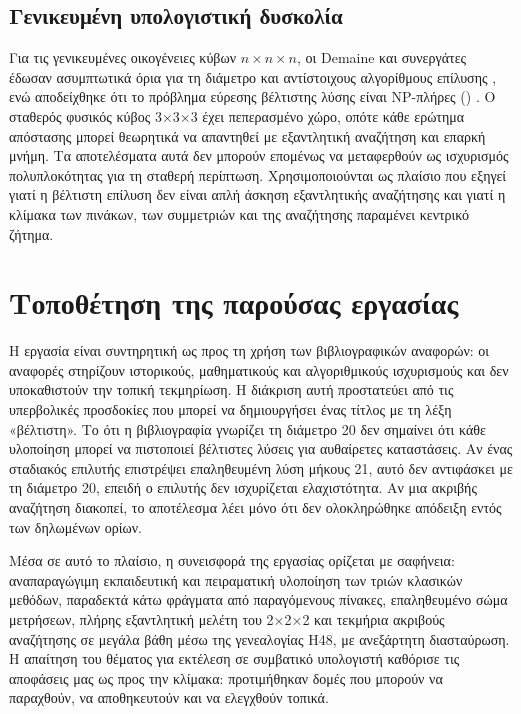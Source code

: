\subsection{Γενικευμένη υπολογιστική δυσκολία}
\label{sec:background-complexity}

Για τις γενικευμένες οικογένειες κύβων \(n\times n\times n\), οι Demaine και συνεργάτες έδωσαν ασυμπτωτικά όρια για τη διάμετρο και αντίστοιχους αλγορίθμους επίλυσης \cite{demaine2011rubik}, ενώ αποδείχθηκε ότι το πρόβλημα εύρεσης βέλτιστης λύσης είναι NP-πλήρες () \cite{demaine2018npcomplete}. Ο σταθερός φυσικός κύβος 3×3×3 έχει πεπερασμένο χώρο, οπότε κάθε ερώτημα απόστασης μπορεί θεωρητικά να απαντηθεί με εξαντλητική αναζήτηση και επαρκή μνήμη. Τα αποτελέσματα αυτά δεν μπορούν επομένως να μεταφερθούν ως ισχυρισμός πολυπλοκότητας για τη σταθερή περίπτωση. Χρησιμοποιούνται ως πλαίσιο που εξηγεί γιατί η βέλτιστη επίλυση δεν είναι απλή άσκηση εξαντλητικής αναζήτησης και γιατί η κλίμακα των πινάκων, των συμμετριών και της αναζήτησης παραμένει κεντρικό ζήτημα.

\section{Τοποθέτηση της παρούσας εργασίας}
\label{sec:background-positioning}

Η εργασία είναι συντηρητική ως προς τη χρήση των βιβλιογραφικών αναφορών: οι αναφορές στηρίζουν ιστορικούς, μαθηματικούς και αλγοριθμικούς ισχυρισμούς και δεν υποκαθιστούν την τοπική τεκμηρίωση. Η διάκριση αυτή προστατεύει από τις υπερβολικές προσδοκίες που μπορεί να δημιουργήσει ένας τίτλος με τη λέξη «βέλτιστη». Το ότι η βιβλιογραφία γνωρίζει τη διάμετρο 20 δεν σημαίνει ότι κάθε υλοποίηση μπορεί να πιστοποιεί βέλτιστες λύσεις για αυθαίρετες καταστάσεις. Αν ένας σταδιακός επιλυτής επιστρέψει επαληθευμένη λύση μήκους 21, αυτό δεν αντιφάσκει με τη διάμετρο 20, επειδή ο επιλυτής δεν ισχυρίζεται ελαχιστότητα. Αν μια ακριβής αναζήτηση διακοπεί, το αποτέλεσμα λέει μόνο ότι δεν ολοκληρώθηκε απόδειξη εντός των δηλωμένων ορίων.

Μέσα σε αυτό το πλαίσιο, η συνεισφορά της εργασίας ορίζεται με σαφήνεια: αναπαραγώγιμη εκπαιδευτική και πειραματική υλοποίηση των τριών κλασικών μεθόδων, παραδεκτά κάτω φράγματα από παραγόμενους πίνακες, επαληθευμένο σώμα μετρήσεων, πλήρης εξαντλητική μελέτη του 2×2×2 και τεκμήρια ακριβούς αναζήτησης σε μεγάλα βάθη μέσω της γενεαλογίας H48, με ανεξάρτητη διασταύρωση. Η απαίτηση του θέματος για εκτέλεση σε συμβατικό υπολογιστή καθόρισε τις αποφάσεις μας ως προς την κλίμακα: προτιμήθηκαν δομές που μπορούν να παραχθούν, να αποθηκευτούν και να ελεγχθούν τοπικά.

